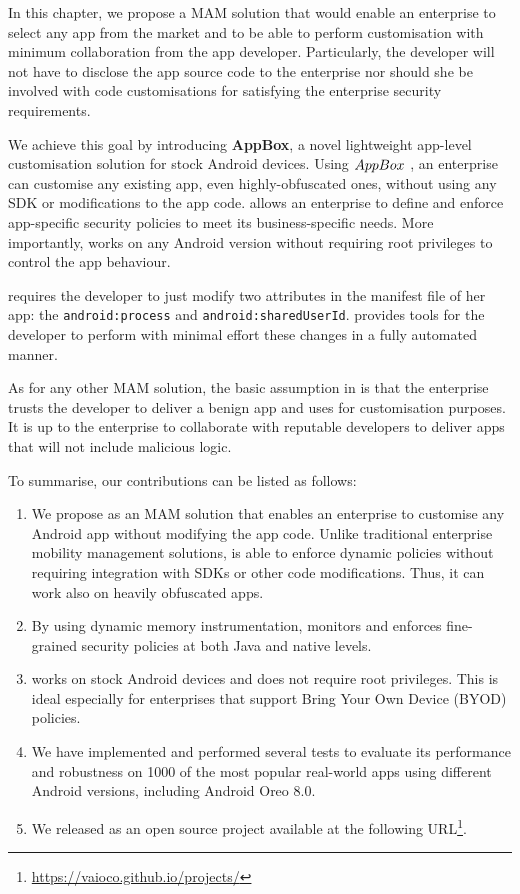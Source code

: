 In this chapter, we propose a MAM solution that would enable an enterprise to select any app from the market and to be able to perform customisation with minimum collaboration from the app developer. 
Particularly, the developer will not have to disclose the app source code to the enterprise nor should she be involved with code customisations for satisfying the enterprise security requirements.

We achieve this goal by introducing \textbf{AppBox}, a novel lightweight app-level customisation solution for stock Android devices.
Using $AppBox~$, an enterprise can customise any existing app, even highly-obfuscated ones, without using any SDK or modifications to the app code.
\asd allows an enterprise to define and enforce app-specific security policies to meet its business-specific needs.
More importantly, \asd works on any Android version without requiring  root privileges to control the app behaviour.

\asd requires the developer to just modify two attributes in the manifest file of her app: the \texttt{android:process} and \texttt{android:sharedUserId}.
\asd provides tools for the developer to perform with minimal effort these changes in a fully automated manner.


As for any other MAM solution, the basic assumption in \asd is that the enterprise trusts the developer to deliver a benign app and uses \asd for customisation purposes.
It is up to the enterprise to collaborate with reputable developers to deliver apps that will not include malicious logic. 


To summarise, our contributions can be listed as follows: 

\begin{enumerate}
\item We propose \asd as an MAM solution that enables an enterprise to customise any Android app without modifying the app code. Unlike traditional enterprise mobility management solutions, \asd is able to enforce dynamic policies without requiring integration with SDKs or other code modifications. Thus, it can work also on heavily obfuscated apps.

\item By using dynamic memory instrumentation, \asd monitors and enforces fine-grained security policies at both Java and native levels.

\item \asd works on stock Android devices and does not require root privileges. This is ideal especially for enterprises that support Bring Your Own Device (BYOD) policies.  

\item We have implemented \asd and performed several tests to evaluate its performance and robustness on 1000 of the most popular real-world apps using  different Android versions, including Android Oreo 8.0. 

\item We released \asd as an open source project available at the following URL\footnote{ \url{https://vaioco.github.io/projects/}}.
\end{enumerate}